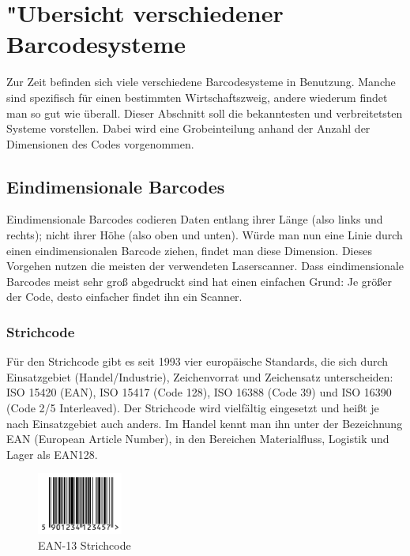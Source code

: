 \section{"Ubersicht verschiedener Barcodesysteme}\label{chap:overview}
Zur Zeit befinden sich viele verschiedene Barcodesysteme in Benutzung. Manche sind spezifisch für einen bestimmten Wirtschaftszweig, andere wiederum findet man so gut wie überall. Dieser Abschnitt soll die bekanntesten und verbreitetsten Systeme vorstellen. Dabei wird eine Grobeinteilung anhand der Anzahl der Dimensionen des Codes vorgenommen.

\subsection{Eindimensionale Barcodes}
Eindimensionale Barcodes codieren Daten entlang ihrer Länge (also links und rechts); nicht ihrer Höhe (also oben und unten). Würde man nun eine Linie durch einen eindimensionalen Barcode ziehen, findet man diese Dimension. Dieses Vorgehen nutzen die meisten der verwendeten Laserscanner. Dass eindimensionale Barcodes meist sehr groß abgedruckt sind hat einen einfachen Grund: Je größer der Code, desto einfacher findet ihn ein Scanner.

\subsubsection{Strichcode}
Für den Strichcode gibt es seit 1993 vier europäische Standards, die sich durch Einsatzgebiet (Handel/Industrie), Zeichenvorrat und Zeichensatz unterscheiden: ISO 15420 (EAN), ISO 15417 (Code 128), ISO 16388 (Code 39) und ISO 16390 (Code 2/5 Interleaved).
Der Strichcode wird vielfältig eingesetzt und heißt je nach Einsatzgebiet auch anders. Im Handel kennt man ihn unter der Bezeichnung EAN (European Article Number), in den Bereichen Materialfluss, Logistik und Lager als EAN128.
\begin{figure}[htbp]%
	\centering
	\includegraphics[width=0.25\textwidth]{Bilder/EAN_13.png}
	\caption[EAN-13 Strichcode]{EAN-13 Strichcode\footnotemark}
	\label{barcode}
\end{figure}
\pagebreak
